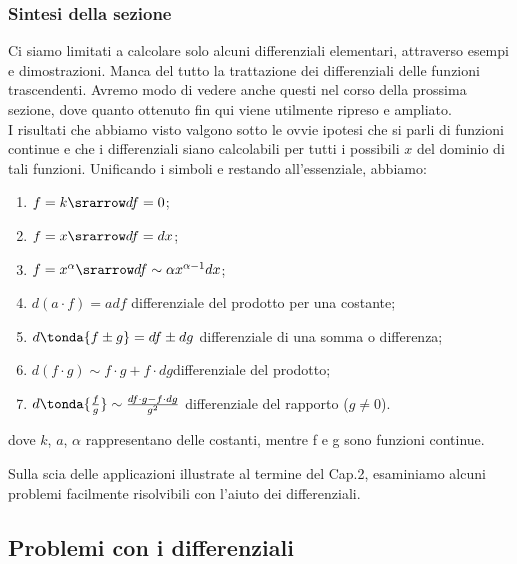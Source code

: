 \subsubsection{Sintesi della sezione}
\label{subsubsec:diff01_diffsint}
Ci siamo limitati a calcolare solo alcuni differenziali elementari, 
attraverso esempi 
e dimostrazioni. Manca del tutto la trattazione dei differenziali delle
funzioni trascendenti. Avremo modo di vedere anche questi nel corso della 
prossima
sezione, dove quanto ottenuto fin qui viene utilmente ripreso e ampliato.\\
I risultati che abbiamo visto valgono sotto le ovvie ipotesi
che si parli di funzioni continue e che i differenziali siano calcolabili
per tutti i possibili $x$ del dominio di tali funzioni. Unificando i simboli 
e restando
all'essenziale, abbiamo:
\begin{enumerate} [noitemsep]
 \item $f=k \srarrow df=0$;
 \item $f=x \srarrow df=dx$;
 \item $f=x^\alpha \srarrow df\sim\alpha x^{\alpha-1}dx$;\newline
 \item $d(a\cdot f)=adf$ \tab differenziale del prodotto per una costante;
 \item $d\tonda{f\pm g}=df\pm dg$ \tab differenziale di una somma o 
differenza;
 \item $d(f\cdot g)\sim f\cdot g+f\cdot dg$\tab differenziale del prodotto;
 \item $d\tonda{\frac{f}{g}}\sim\frac{df\cdot g-f\cdot dg}{g^2}$\tab  
differenziale 
 del rapporto (\(g \ne 0\)).
\end{enumerate}
dove  $k$, $a$, $\alpha$ rappresentano delle costanti, mentre f e g sono 
funzioni continue. 


Sulla scia delle applicazioni illustrate al termine del Cap.2, esaminiamo 
alcuni problemi facilmente risolvibili con l'aiuto dei differenziali.

\subsection{Problemi con i differenziali}
\label{subsec:diff01__problemi}

